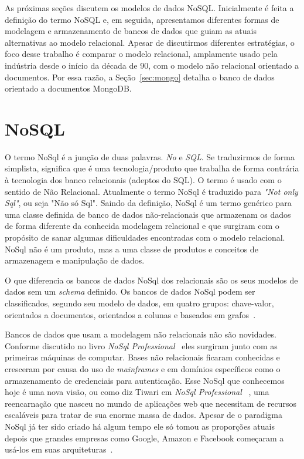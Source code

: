 
As próximas seções discutem os modelos de dados NoSQL. Inicialmente é
feita a definição do termo NoSQL e, em seguida,
apresentamos diferentes formas de modelagem e armazenamento de bancos de
dados que guiam as atuais alternativas ao modelo relacional. Apesar de
discutirmos diferentes estratégias, o foco desse trabalho é comparar o
modelo relacional, amplamente usado pela indústria desde o início da
década de 90, com o modelo não relacional orientado a documentos. Por
essa razão, a Seção~\ref{sec:mongo} detalha o banco de dados orientado
a documentos MongoDB. 


\section{NoSQL}

O termo NoSql é a junção de duas palavras. \textit{No} e \textit{SQL}. Se traduzirmos de forma simplista, significa que é uma tecnologia/produto que trabalha de forma contrária à tecnologia dos banco relacionais (adeptos do SQL). O termo é usado com o sentido de Não Relacional. Atualmente o termo NoSql é traduzido para \textit{"Not only Sql"}, ou seja "Não só Sql".
Saindo da definição, NoSql é um termo genérico para uma classe definida de banco de dados não-relacionais que armazenam os dados  de forma diferente da conhecida modelagem relacional e que surgiram com o propósito de sanar algumas dificuldades encontradas com o modelo relacional. NoSql não é um produto, mas a uma classe de produtos e conceitos de armazenagem e manipulação de dados. 

O que diferencia os bancos de dados NoSql dos relacionais são os seus modelos de dados sem um \textit{schema} definido. Os bancos de dados NoSql podem ser classificados, segundo seu modelo de dados, em quatro grupos: chave-valor, orientados a documentos, orientados a colunas e baseados em grafos~\cite{nosqlxrelacional,nosqlevaluation}.

Bancos de dados que usam a modelagem não relacionais não são novidades. Conforme discutido no livro \emph{NoSql Professional}~\cite{nosqlprofessional} eles surgiram junto com as primeiras máquinas de computar. Bases não relacionais ficaram conhecidas e cresceram por causa do uso de \textit{mainframes} e em domínios específicos como o armazenamento de credenciais para autenticação. Esse NoSql que conhecemos hoje é uma nova visão, ou como diz Tiwari em \emph{NoSql Professional} ~\cite{nosqlprofessional}, uma reencarnação que nasceu no mundo de aplicações web que necessitam de recursos escaláveis para tratar de sua enorme massa de dados. Apesar de o paradigma NoSql já ter sido criado há algum tempo ele só tomou as proporções atuais depois que grandes empresas como Google, Amazon e Facebook começaram a usá-los em suas arquiteturas~\cite{nosqlevaluation}.

